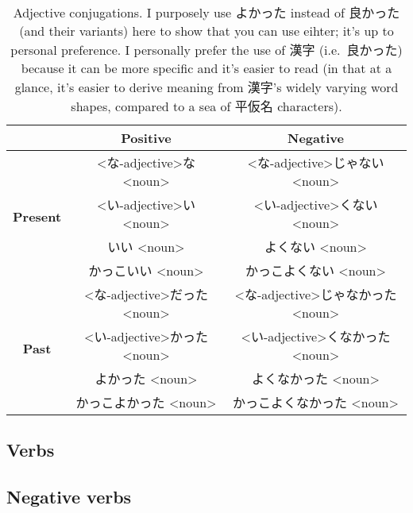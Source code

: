 \documentclass[../nihongo-gakushuu-kyouzai.tex]{subfiles}
\begin{document}
\begin{table}[h]
\centering
\begin{tabular}{@{}ccc@{}}
    \toprule
    & \textbf{Positive} & \textbf{Negative} \\ \midrule
    \multirow{4}{*}{\textbf{Present}} & <な-adjective>な<noun> & <な-adjective>じゃない<noun> \\
    & <い-adjective>い <noun> & <い-adjective>くない <noun> \\
    & いい <noun> & よくない <noun> \\
    & かっこいい <noun> & かっこよくない <noun> \\
    \midrule
    \multirow{4}{*}{\textbf{Past}} &  <な-adjective>だった<noun> &  <な-adjective>じゃなかった<noun> \\
    & <い-adjective>かった <noun> & <い-adjective>くなかった <noun> \\
    & よかった <noun> & よくなかった <noun> \\
    & かっこよかった <noun> & かっこよくなかった <noun> \\ \bottomrule
\end{tabular}%
\caption{Adjective conjugations. I purposely use よかった instead of 良かった (and their variants) here to show that you can use eihter; it's up to personal preference. I personally prefer the use of 漢字 (i.e.\ 良かった) because it can be more specific and it's easier to read (in that at a glance, it's easier to derive meaning from 漢字's widely varying word shapes, compared to a sea of 平仮名 characters).}
\label{tbl:adjective-conjugations}
\end{table}

\subsection{Verbs}

\subsection{Negative verbs}
\end{document}
